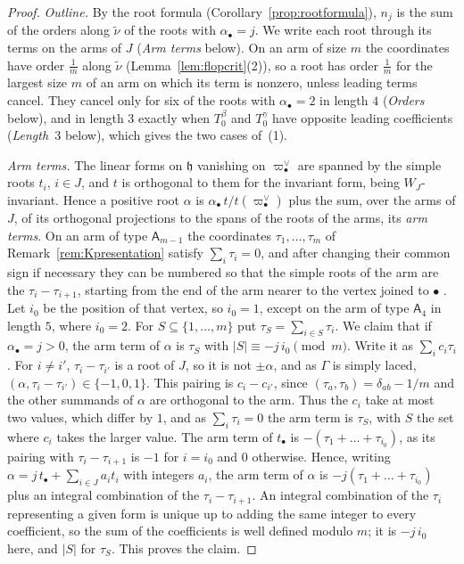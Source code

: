 \documentclass[11pt]{amsart}
\numberwithin{table}{section}
\numberwithin{figure}{section}
\numberwithin{equation}{section}
\theoremstyle{definition}
\theoremstyle{plain}
\newcommand{\h}{\mathfrak{h}}
\newcommand{\bul}{\bullet}
\newcommand{\tnu}{\tilde\nu}
\begin{document}
\begin{proof}
\emph{Outline.} By the root formula (Corollary~\ref{prop:rootformula}), $n_j$ is the sum of the orders along $\tnu$ of the roots with $\alpha_\bul = j$. We write each root through its terms on the arms of $J$ (\emph{Arm terms} below). On an arm of size $m$ the coordinates have order $\frac1m$ along $\tnu$ (Lemma~\ref{lem:flopcrit}(2)), so a root has order $\frac1m$ for the largest size $m$ of an arm on which its term is nonzero, unless leading terms cancel. They cancel only for six of the roots with $\alpha_\bul = 2$ in length $4$ (\emph{Orders} below), and in length $3$ exactly when $T_0^\beta$ and $T_0^\gamma$ have opposite leading coefficients (\emph{Length~$3$} below), which gives the two cases of~(1).

\emph{Arm terms.} The linear forms on $\h$ vanishing on $\varpi_\bul^\vee$ are spanned by the simple roots $t_i$, $i \in J$, and $t$ is orthogonal to them for the invariant form, being $W_J$-invariant. Hence a positive root $\alpha$ is $\alpha_\bul\, t/t(\varpi_\bul^\vee)$ plus the sum, over the arms of $J$, of its orthogonal projections to the spans of the roots of the arms, its \emph{arm terms}. On an arm of type $\mathsf{A}_{m-1}$ the coordinates $\tau_1, \dots, \tau_m$ of Remark~\ref{rem:Kpresentation} satisfy $\sum_i \tau_i = 0$, and after changing their common sign if necessary they can be numbered so that the simple roots of the arm are the $\tau_i - \tau_{i+1}$, starting from the end of the arm nearer to the vertex joined to $\bul$ \cite[Examples~4.24--4.27]{K}. Let $i_0$ be the position of that vertex, so $i_0 = 1$, except on the arm of type $\mathsf{A}_4$ in length $5$, where $i_0 = 2$. For $S \subseteq \{1, \dots, m\}$ put $\tau_S = \sum_{i \in S}\tau_i$. We claim that if $\alpha_\bul = j > 0$, the arm term of $\alpha$ is $\tau_S$ with $|S| \equiv -j\,i_0 \pmod m$. Write it as $\sum_i c_i\tau_i$. For $i \neq i'$, $\tau_i - \tau_{i'}$ is a root of $J$, so it is not $\pm\alpha$, and as $\Gamma$ is simply laced, $(\alpha, \tau_i - \tau_{i'}) \in \{-1, 0, 1\}$. This pairing is $c_i - c_{i'}$, since $(\tau_a, \tau_b) = \delta_{ab} - 1/m$ and the other summands of $\alpha$ are orthogonal to the arm. Thus the $c_i$ take at most two values, which differ by $1$, and as $\sum_i \tau_i = 0$ the arm term is $\tau_S$, with $S$ the set where $c_i$ takes the larger value. The arm term of $t_\bul$ is $-(\tau_1 + \dots + \tau_{i_0})$, as its pairing with $\tau_i - \tau_{i+1}$ is $-1$ for $i = i_0$ and $0$ otherwise. Hence, writing $\alpha = j\,t_\bul + \sum_{i \in J} a_i t_i$ with integers $a_i$, the arm term of $\alpha$ is $-j(\tau_1 + \dots + \tau_{i_0})$ plus an integral combination of the $\tau_i - \tau_{i+1}$. An integral combination of the $\tau_i$ representing a given form is unique up to adding the same integer to every coefficient, so the sum of the coefficients is well defined modulo $m$; it is $-j\,i_0$ here, and $|S|$ for $\tau_S$. This proves the claim.


\end{proof}
\end{document}
